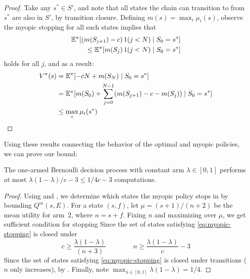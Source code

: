 \begin{hiddenproof}
	\begin{proof}
	Take any $s^*\in S'$, and note that all states the chain can transition
	to from $s^*$ are also in $S'$, by transition closure.  Defining $m(s) = \max_i\mu_i(s)$, 
	observe the myopic stopping for all such states implies that
	\begin{align*}
		\mathbb{E}^{\pi}[(m(S_{j+1}) - c)\, 1(j<N)\mid S_0=s^*] \\
		\le \mathbb{E}^{\pi}[m(S_{j})\, 1(j<N)\mid S_0=s^*]
	\end{align*}
	holds for all $j$, and as a result:
	\begin{align*}
		V^\pi(s) 
		&= \mathbb{E}^{\pi}[ - c N + m(S_N) \mid S_0=s^*] \\
		&= \mathbb{E}^{\pi}[m(S_0) + \sum_{j=0}^{N-1} (m(S_{j+1}) - c - m(S_j)) \mid S_0=s^*] \\
		&\le \max_i\mu_i(s^*) \qedhere
	\end{align*}
	\end{proof}	
\end{hiddenproof}

Using these results connecting the behavior of the optimal and myopic policies, we can prove our bound:

\begin{thm}\label{thm:one-action-bound}
	The one-armed Bernoulli decision process with constant arm $\lambda\in[0,1]$ 
	performs at most $\lambda(1-\lambda)/c-3 \le 1/4c-3$ computations.
\end{thm}
\begin{proof}
Using  and , we determine
which states the myopic policy stops in by bounding $Q^m(s,E)$.  For a state $(s,f)$,
let $\mu=(s+1)/(n+2)$ be the mean utility for arm~2, where $n=s+f$.
Fixing $n$ and maximizing over $\mu$, we get sufficient condition for stopping
Since the set of states satisfying \eqref{eq:myopic-stopping} is closed under
\begin{equation}
	c \ge \frac{\lambda(1-\lambda)}{(n+3)} \qquad\qquad   n\ge \frac{\lambda(1-\lambda)}{c} - 3  \label{eq:myopic-stopping}
\end{equation}
Since the set of states satisfying \eqref{eq:myopic-stopping} is closed under
transitions ($n$ only increases), by .  Finally, note $\max_{\lambda\in[0,1]} \lambda(1-\lambda)=1/4$.
\end{proof}	


